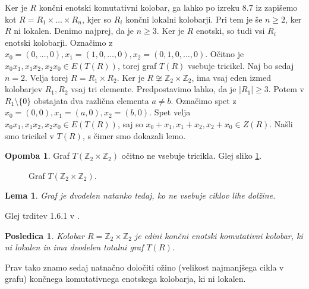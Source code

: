 \documentclass[a4paper, 12pt]{amsart}
\theoremstyle{definition} %
\newtheorem{opomba}[definicija]{Opomba}
\theoremstyle{plain} %
\newtheorem{lema}[definicija]{Lema}
\newtheorem{posledica}[definicija]{Posledica}
\newcommand{\Z}{\mathbb Z}
\begin{document}
\proof 
Ker je $R$ končni enotski komutativni kolobar, ga lahko po izreku 8.7 iz \cite{Atiyah} zapišemo kot $R=R_1 \times \dots\times R_n$, kjer so $R_i$ končni lokalni kolobarji. Pri tem je še $n\ge 2$, ker $R$ ni lokalen. Denimo najprej, da je $n\ge 3$. Ker je $R$ enotski, so tudi vsi $R_i$ enotski kolobarji. Označimo z $x_0 = (0,\dots,0), x_1 = (1,0,\dots,0), x_2 = (0,1,0,\dots,0)$. Očitno je $x_0 x_1, x_1 x_2, x_2 x_0 \in E(T(R))$, torej graf $T(R)$ vsebuje tricikel. Naj bo sedaj $n=2$. Velja torej $R= R_1 \times R_2$. Ker je $R\not \cong\Z_2 \times \Z_2$, ima vsaj eden izmed kolobarjev $R_1, R_2$ vsaj tri elemente. Predpostavimo lahko, da je $|R_1| \ge 3$. Potem v $R_1 \setminus\{0 \}$ obstajata dva različna elementa $a\neq b$. Označimo spet z $x_0 = (0,0), x_1 = (a,0), x_2 = (b,0)$. Spet velja $x_0 x_1, x_1 x_2, x_2 x_0 \in E(T(R))$, saj so $x_0 + x_1, x_1 + x_2, x_2 + x_0\in Z(R)$. Našli smo tricikel v $T(R)$, s čimer smo dokazali lemo.
\endproof

\begin{opomba}
Graf $T(\Z_2 \times \Z_2)$ očitno ne vsebuje tricikla. Glej sliko \ref{T(Z2xZ2)}.
\end{opomba}

\begin{figure}[h!]
\centering
{}
\caption{Graf $T(\Z_2 \times \Z_2).$}
\label{T(Z2xZ2)}
\end{figure}

\begin{lema}
Graf je dvodelen natanko tedaj, ko ne vsebuje ciklov lihe dolžine.
\end{lema}

\proof
Glej trditev 1.6.1 v \cite{Diestel}.
\endproof

\begin{posledica}
Kolobar $R=\Z_2 \times \Z_2$ je edini končni enotski komutativni kolobar, ki ni lokalen in ima dvodelen totalni graf $T(R)$.
\end{posledica}

Prav tako znamo sedaj natnačno določiti ožino (velikost najmanjšega cikla v grafu) končnega komutativnega enotskega kolobarja, ki ni lokalen.
\end{document}
